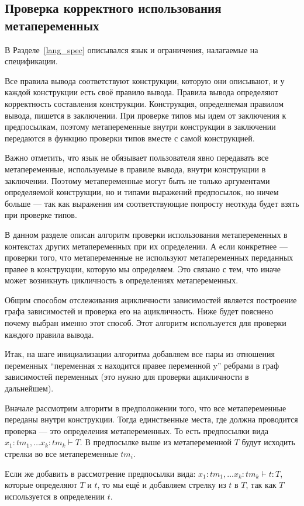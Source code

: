 \subsection{Проверка корректного использования метапеременных}\label{toposort}
В Разделе~\ref{lang_spec} описывался язык и ограничения, налагаемые на спецификации.

Все правила вывода соответствуют конструкции, которую они описывают, и у каждой конструкции есть своё правило вывода. Правила вывода определяют корректность составления конструкции. Конструкция, определяемая правилом вывода, пишется в заключении. При проверке типов мы идем от заключения к предпосылкам, поэтому метапеременные внутри конструкции в заключении передаются в функцию проверки типов вместе с самой конструкцией.

Важно отметить, что язык не обязывает пользователя явно передавать все метапеременные, используемые в правиле вывода, внутри конструкции в заключении. Поэтому метапеременные могут быть не только аргументами определяемой конструкции, но и типами выражений предпосылок, но ничем больше --- так как выражения им соответствующие попросту неоткуда будет взять при проверке типов.

В данном разделе описан алгоритм проверки использования метапеременных в контекстах других метапеременных при их определении. А если конкретнее --- проверки того, что метапеременные не используют метапеременных переданных правее в конструкции, которую мы определяем. Это связано с тем, что иначе может возникнуть цикличность в определениях метапеременных.

Общим способом отслеживания ацикличности зависимостей является построение графа зависимостей и проверка его на ацикличность. Ниже будет пояснено почему выбран именно этот способ. Этот алгоритм используется для проверки каждого правила вывода.

Итак, на шаге инициализации алгоритма добавляем все пары из отношения переменных ``переменная x находится правее переменной y'' ребрами в граф зависимостей переменных (это нужно для проверки ацикличности в дальнейшем).

Вначале рассмотрим алгоритм в предположении того, что все метапеременные переданы внутри конструкции.
Тогда единственные места, где должна проводится проверка --- это определения метапеременных. То есть предпосылки вида $x_1 : tm_1, \ldots x_k : tm_k  \vdash T$. В предпосылке выше из метапеременной $T$ будут исходить стрелки во все метапеременные $tm_i$.

Если же добавить в рассмотрение предпосылки вида: $x_1 : tm_1, \ldots x_k : tm_k  \vdash t : T$, которые определяют $T$ и $t$, то мы ещё и добавляем стрелку из $t$ в $T$, так как $T$ используется в определении $t$.

